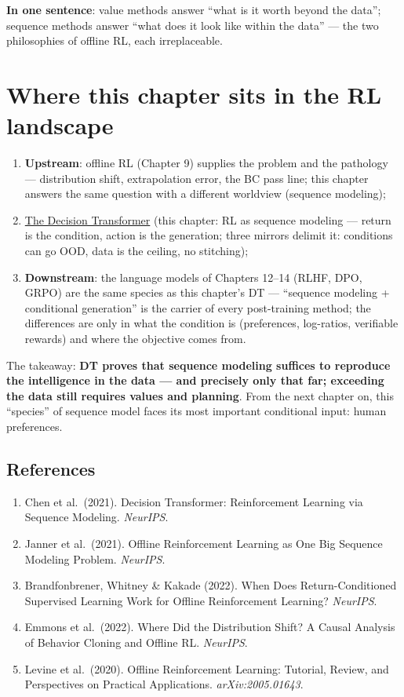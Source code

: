 \documentclass{article}
\begin{document}
\textbf{In one sentence}: value methods answer ``what is it worth beyond the data''; sequence methods answer ``what does it look like within the data'' --- the two philosophies of offline RL, each irreplaceable.

\section*{Where this chapter sits in the RL landscape}

\begin{enumerate}
  \item \textbf{Upstream}: offline RL (Chapter 9) supplies the problem and the pathology --- distribution shift, extrapolation error, the BC pass line; this chapter answers the same question with a different worldview (sequence modeling);
  \item \underline{The Decision Transformer} (this chapter: RL as sequence modeling --- return is the condition, action is the generation; three mirrors delimit it: conditions can go OOD, data is the ceiling, no stitching);
  \item \textbf{Downstream}: the language models of Chapters 12--14 (RLHF, DPO, GRPO) are the same species as this chapter's DT --- ``sequence modeling + conditional generation'' is the carrier of every post-training method; the differences are only in what the condition is (preferences, log-ratios, verifiable rewards) and where the objective comes from.
\end{enumerate}

The takeaway: \textbf{DT proves that sequence modeling suffices to reproduce the intelligence in the data --- and precisely only that far; exceeding the data still requires values and planning}. From the next chapter on, this ``species'' of sequence model faces its most important conditional input: human preferences.

\subsection*{References}

\begin{enumerate}
  \item Chen et al.\ (2021). Decision Transformer: Reinforcement Learning via Sequence Modeling. \textit{NeurIPS}.
  \item Janner et al.\ (2021). Offline Reinforcement Learning as One Big Sequence Modeling Problem. \textit{NeurIPS}.
  \item Brandfonbrener, Whitney \& Kakade (2022). When Does Return-Conditioned Supervised Learning Work for Offline Reinforcement Learning? \textit{NeurIPS}.
  \item Emmons et al.\ (2022). Where Did the Distribution Shift? A Causal Analysis of Behavior Cloning and Offline RL. \textit{NeurIPS}.
  \item Levine et al.\ (2020). Offline Reinforcement Learning: Tutorial, Review, and Perspectives on Practical Applications. \textit{arXiv:2005.01643}.
\end{enumerate}
\end{document}
